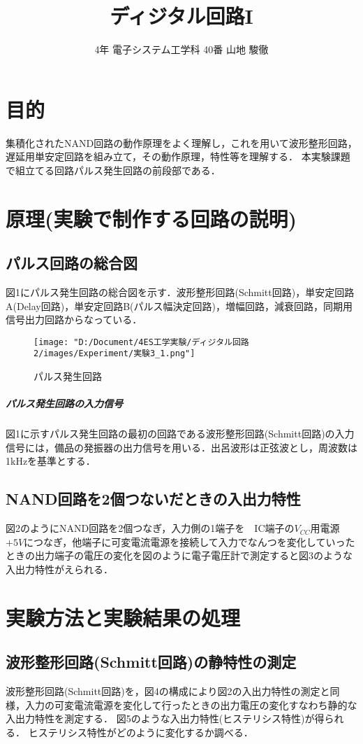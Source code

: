 \documentclass[10pt, a4j, dvipdfmx]{jarticle}
\title{ディジタル回路I}
\author{4年 電子システム工学科 40番  山地 駿徹}
\begin{document}
\section{目的}
集積化されたNAND回路の動作原理をよく理解し，これを用いて波形整形回路，遅延用単安定回路を組み立て，その動作原理，特性等を理解する．
本実験課題で組立てる回路パルス発生回路の前段部である．


\section{原理(実験で制作する回路の説明)}

\subsection{パルス回路の総合図}
図1にパルス発生回路の総合図を示す．波形整形回路(Schmitt回路)，単安定回路A(Delay回路)，単安定回路B(パルス幅決定回路)，増幅回路，減衰回路，同期用信号出力回路からなっている．
\begin{figure}[H]
	\centering
	\texttt{[image: "D:/Document/4ES工学実験/ディジタル回路2/images/Experiment/実験3\_1.png"]}
	\caption{パルス発生回路}
\end{figure}
\subparagraph{パルス発生回路の入力信号}
図1に示すパルス発生回路の最初の回路である波形整形回路(Schmitt回路)の入力信号には，備品の発振器の出力信号を用いる．出呂波形は正弦波とし，周波数は1kHzを基準とする．

\subsection{NAND回路を2個つないだときの入出力特性}
図2のようにNAND回路を2個つなぎ，入力側の1端子を　IC端子の$V_{CC}$用電源$+5V$につなぎ，他端子に可変電流電源を接続して入力でなんつを変化していったときの出力端子の電圧の変化を図のように電子電圧計で測定すると図3のような入出力特性がえられる．


\section{実験方法と実験結果の処理}

\subsection{波形整形回路(Schmitt回路)の静特性の測定}
波形整形回路(Schmitt回路)を，図4の構成により図2の入出力特性の測定と同様，入力の可変電流電源を変化して行ったときの出力電圧の変化すなわち静的な入出力特性を測定する．
図5のような入出力特性(ヒステリシス特性)が得られる．
ヒステリシス特性がどのように変化するか調べる．
\end{document}

